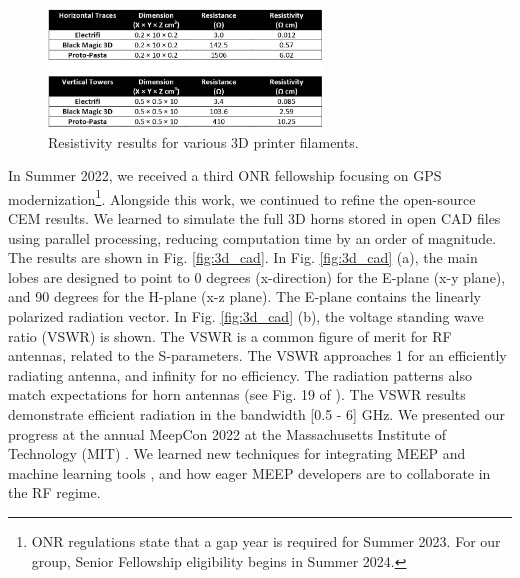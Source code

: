 \documentclass[../../main.tex]{subfiles}
\begin{document}
\begin{figure}[ht]
\centering
\includegraphics[width=0.65\textwidth]{figures/multi3dllc.png}
\caption{\label{fig:3d_print2} Resistivity results for various 3D printer filaments.}
\end{figure}

In Summer 2022, we received a third ONR fellowship focusing on GPS modernization\footnote{ONR regulations state that a gap year is required for Summer 2023.  For our group, Senior Fellowship eligibility begins in Summer 2024.}.  Alongside this work, we continued to refine the open-source CEM results.  We learned to simulate the full 3D horns stored in open CAD files using parallel processing, reducing computation time by an order of magnitude.  The results are shown in Fig. \ref{fig:3d_cad}.  In Fig. \ref{fig:3d_cad} (a), the main lobes are designed to point to 0 degrees (x-direction) for the E-plane (x-y plane), and 90 degrees for the H-plane (x-z plane).  The E-plane contains the linearly polarized radiation vector.  In Fig. \ref{fig:3d_cad} (b), the voltage standing wave ratio (VSWR) is shown.  The VSWR is a common figure of merit for RF antennas, related to the S-parameters.  The VSWR approaches 1 for an efficiently radiating antenna, and infinity for no efficiency.  The radiation patterns also match expectations for horn antennas (see Fig. 19 of \cite{8786183}).  The VSWR results demonstrate efficient radiation in the bandwidth [0.5 - 6] GHz.  We presented our progress at the annual MeepCon 2022 at the Massachusetts Institute of Technology (MIT) \cite{meepcon2022}.  We learned new techniques for integrating MEEP and machine learning tools \cite{meepcon2022_2}, and how eager MEEP developers are to collaborate in the RF regime.  \\ \vspace{2.5mm}
\end{document}

